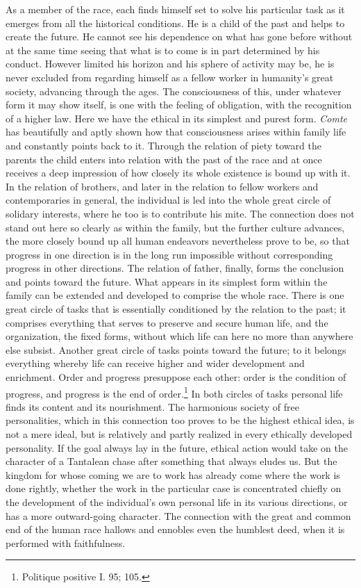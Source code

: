 \documentclass[12pt,a4paper,openany]{book}
\newcommand{\opage}[1]{\marginnote{\footnotesize\textit{[#1]}}}
\begin{document}
As a member of the race, each finds himself set to solve his particular task
as it emerges from all the historical conditions. He is a child of the past
and helps to create the future. He cannot see his dependence on what has gone
before without at the same time seeing that what is to come is in part
determined by his conduct. However limited \opage{80}his horizon and his
sphere of activity may be, he is never excluded from regarding himself as a
fellow worker in humanity's great society, advancing through the ages. The
consciousness of this, under whatever form it may show itself, is one with the
feeling of obligation, with the recognition of a higher law. Here we have the
ethical in its simplest and purest form. \emph{Comte} has beautifully and
aptly shown how that consciousness arises within family life and constantly
points back to it. Through the relation of piety toward the parents the child
enters into relation with the past of the race and at once receives a deep
impression of how closely its whole existence is bound up with it. In the
relation of brothers, and later in the relation to fellow workers and
contemporaries in general, the individual is led into the whole great circle
of solidary interests, where he too is to contribute his mite. The connection
does not stand out here so clearly as within the family, but the further
culture advances, the more closely bound up all human endeavors nevertheless
prove to be, so that progress in one direction is in the long run impossible
without corresponding progress in other directions. The relation of father,
finally, forms the conclusion and points toward the future. What appears in
its simplest form within the family can be extended and developed to comprise
the whole race. There is one great circle of tasks that is essentially
conditioned by the relation to the past; it comprises everything that serves
to preserve and secure human life, and the organization, the fixed forms,
without which life can here no more \opage{81}than anywhere else subsist.
Another great circle of tasks points toward the future; to it belongs
everything whereby life can receive higher and wider development and
enrichment. Order and progress presuppose each other: order is the condition
of progress, and progress is the end of order.\footnote[1]{Politique positive
I. 95; 105.} In both circles of tasks personal life finds its content and its
nourishment. The harmonious society of free personalities, which in this
connection too proves to be the highest ethical idea, is not a mere ideal, but
is relatively and partly realized in every ethically developed personality. If
the goal always lay in the future, ethical action would take on the character
of a Tantalean chase after something that always eludes us. But the kingdom
for whose coming we are to work has already come where the work is done
rightly, whether the work in the particular case is concentrated chiefly on
the development of the individual's own personal life in its various
directions, or has a more outward-going character. The connection with the
great and common end of the human race hallows and ennobles even the humblest
deed, when it is performed with faithfulness.
\end{document}
